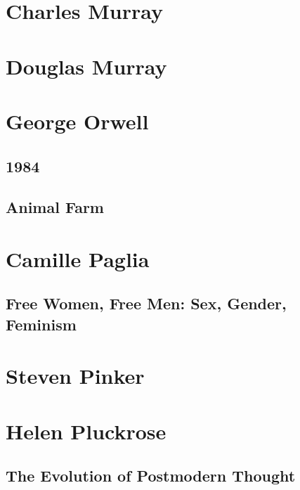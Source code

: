 \documentclass[10pt,titlepage]{book}
\begin{document}
\section{Charles Murray \cite{murrayc-tbc,murrayc-hd}}

\section{Douglas Murray}

\cite{murrayd-vi,murrayd-sde,murrayd-tmc}

\section{George Orwell}

\subsection{1984}

\cite{orwell-1984}

\subsection{Animal Farm \cite{orwell-af}}

\section{Camille Paglia}

\subsection{Free Women, Free Men: Sex, Gender, Feminism \cite{paglia-fw}}

\section{Steven Pinker}

\cite{pinker-tbs,pinker-angels,pinker-en}

\section{Helen Pluckrose}\label{Pluckrose}

\subsection{The Evolution of Postmodern Thought}\label{EPT}
\end{document}
